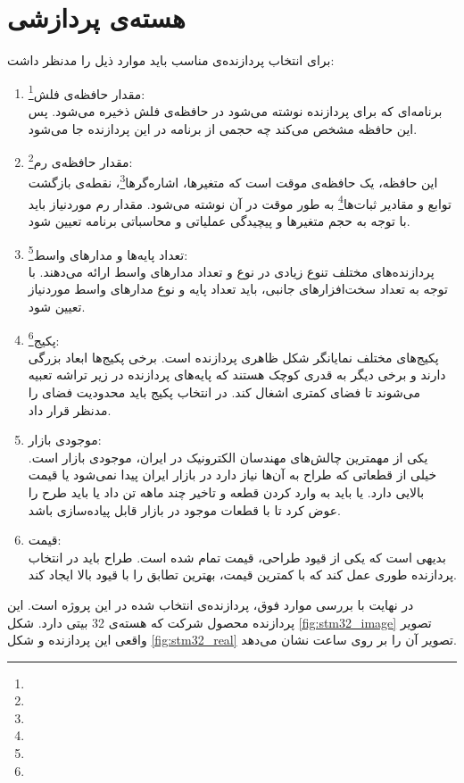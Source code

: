 \section{هسته‌ی پردازشی} \label{sec:mcu}
برای انتخاب پردازنده‌ی مناسب باید موارد ذیل را مدنظر داشت:
\begin{enumerate}
	\item مقدار حافظه‌ی فلش\footnote{}:\\
	برنامه‌ای که برای پردازنده نوشته می‌شود در حافظه‌ی فلش ذخیره می‌شود. پس این حافظه مشخص می‌کند چه حجمی از برنامه در این پردازنده جا می‌شود.
	\item مقدار حافظه‌ی رم\footnote{}:\\
	این حافظه، یک حافظه‌ی موقت است که متغیرها، اشاره‌گرها\footnote{}، نقطه‌ی بازگشت توابع و مقادیر ثبات‌ها\footnote{} به طور موقت در آن نوشته می‌شود. مقدار رم موردنیاز باید با توجه به حجم متغیرها و پیچیدگی عملیاتی و محاسباتی برنامه تعیین شود.
	\item تعداد پایه‌ها و مدارهای واسط\footnote{}:\\
	پردازنده‌های مختلف تنوع زیادی در نوع و تعداد مدارهای واسط ارائه می‌دهند. با توجه به تعداد سخت‌افزارهای جانبی، باید تعداد پایه و نوع مدارهای واسط موردنیاز تعیین شود.
	\item پکیج\footnote{}:\\
	پکیج‌های مختلف نمایانگر شکل ظاهری پردازنده است. برخی پکیج‌ها ابعاد بزرگی دارند و برخی دیگر به قدری کوچک هستند که پایه‌های پردازنده در زیر تراشه تعبیه می‌شوند تا فضای کمتری اشغال کند. در انتخاب پکیج باید محدودیت فضای \pcbf را مدنظر قرار داد.
	\item موجودی بازار:\\
	یکی از مهمترین چالش‌های مهندسان الکترونیک در ایران، موجودی بازار است. خیلی از قطعاتی که طراح به آن‌ها نیاز دارد در بازار ایران پیدا نمی‌شود یا قیمت بالایی دارد. یا باید به وارد کردن قطعه و تاخیر چند ماهه تن داد یا باید طرح را عوض کرد تا با قطعات موجود در بازار قابل پیاده‌سازی باشد.
	\item قیمت:\\
	بدیهی است که یکی از قیود طراحی، قیمت تمام شده است. طراح باید در انتخاب پردازنده طوری عمل کند که با کمترین قیمت، بهترین تطابق را با قیود بالا ایجاد کند.
\end{enumerate}

در نهایت با بررسی موارد فوق، پردازنده‌ی انتخاب شده در این پروژه  است. این پردازنده محصول شرکت  که هسته‌ی  32 بیتی دارد. شکل \ref{fig:stm32_image} تصویر واقعی این پردازنده و شکل \ref{fig:stm32_real} تصویر آن را بر روی \pcbf ساعت نشان می‌دهد.


